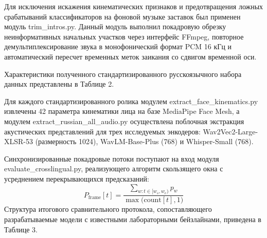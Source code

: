 \documentclass[a4paper,14pt]{extarticle}
\begin{document}
	Для исключения искажения кинематических признаков и предотвращения ложных срабатываний классификаторов на фоновой музыке заставок был применен модуль trim\_intros.py. Данный модуль выполнил покадровую обрезку неинформативных начальных участков через интерфейс FFmpeg, повторное демультиплексирование звука в монофонический формат PCM 16 кГц и автоматический пересчет временных меток заикания со сдвигом временной оси.
	
	Характеристики полученного стандартизированного русскоязычного набора данных представлены в Таблице 2.
	
	\begin{table}[h!]
		\centering
		\captionsetup[table]{justification=centering, labelsep=period}
		\vspace{0.3cm}
		\caption{Количественные характеристики подготовленного русскоязычного видеокорпуса}
	\end{table}
	
	Для каждого стандартизированного ролика модулем extract\_face\_kinematics.py извлечены 42 параметра кинематики лица на базе MediaPipe Face Mesh, а модулем extract\_russian\_all\_audio.py осуществлена поблочная экстракция акустических представлений для трех исследуемых энкодеров: Wav2Vec2-Large-XLSR-53 (размерность 1024), WavLM-Base-Plus (768) и Whisper-Small (768).
	
	Синхронизированные покадровые потоки поступают на вход модуля evaluate\_crosslingual.py, реализующего алгоритм скользящего окна с усреднением перекрывающихся предсказаний:
	\begin{equation}
		P_{\text{frame}}[t] = \frac{\sum_{w: t \in [w_s, w_e)} p_w}{\max\big(\text{count}[t], 1\big)}
	\end{equation}
	Структура итогового сравнительного протокола, сопоставляющего разрабатываемые модели с известными лабораторными бейзлайнами, приведена в Таблице 3.
	
\end{document}

